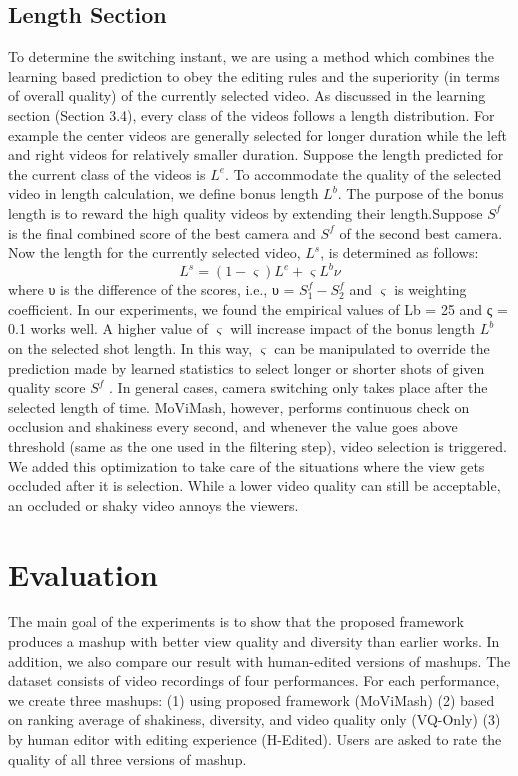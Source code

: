 \documentclass{IEEEtran}
\begin{document}
\subsection{Length Section}
To determine the switching instant, we are using a method which combines the learning based prediction to obey the editing rules and the superiority (in terms of overall quality) of the currently selected video. As discussed in the learning section (Section 3.4), every class of the videos follows a length distribution. For example the center videos are generally selected for longer duration while the left and right videos for relatively smaller duration. Suppose the length predicted for the current class of the videos is $L^e$. To accommodate the quality of the selected video in length calculation, we define bonus length $L^b$. The purpose of the bonus
length is to reward the high quality videos by extending their length.Suppose $S^f$ is the final combined score of the best camera and $S^f$ of the second best camera. Now the length for the currently selected video, $L^s$, is determined as follows:
\[
L^s = (1-\varsigma)L^e + \varsigma L^b\nu
\]
where υ is the difference of the scores, i.e., υ = $S_1^f-S_2^f$  and $\varsigma$ is weighting coefficient. In our experiments, we found the empirical values of Lb = 25 and ς = 0.1 works well. A higher value of $\varsigma$ will increase impact of the bonus length $L^b$ on the selected shot length. In this way, $\varsigma$ can be manipulated to override the prediction made by learned statistics to select longer or shorter shots of given quality score $S^f$ .
In general cases, camera switching only takes place after the selected length of time. MoViMash, however, performs continuous check on occlusion and shakiness every second, and whenever the
value goes above threshold (same as the one used in the filtering step), video selection is triggered. We added this optimization to take care of the situations where the view gets occluded after it is selection. While a lower video quality can still be acceptable, an occluded or shaky video annoys the viewers.

\section{Evaluation}
The main goal of the experiments is to show that the proposed framework produces a mashup with better view quality and diversity than earlier works. In addition, we also compare our result with human-edited versions of mashups. The dataset consists of video recordings of four performances. For each performance, we create three mashups: (1) using proposed framework (MoViMash) (2) based on ranking average of shakiness, diversity, and video quality only (VQ-Only) (3) by human editor with editing experience (H-Edited). Users are asked to rate the quality of all three versions of mashup.
\end{document}
